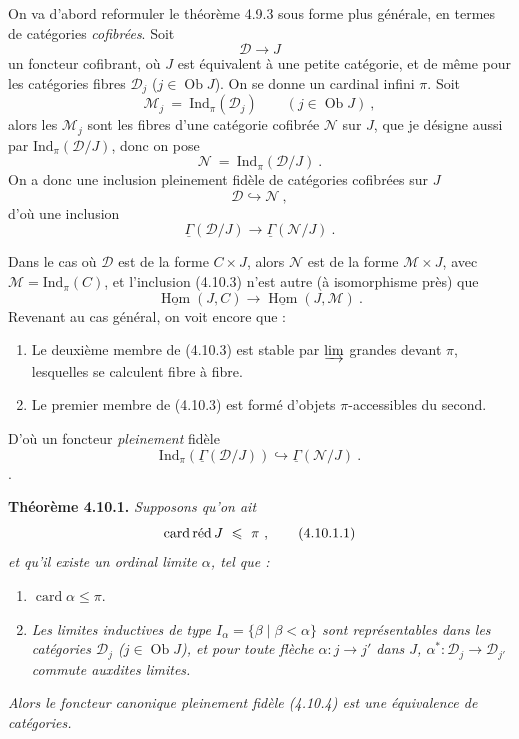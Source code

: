 \documentclass[11pt]{article}
\newcommand{\printedpage}[1]{\marginpar{\footnotesize p.~#1}}
\newcommand{\msp}[1]{\marginpar{\footnotesize [#1]}}
\newcommand{\Ind}{\mathrm{Ind}}
\newcommand{\Ob}{\operatorname{Ob}}
\newcommand{\card}{\operatorname{card}}
\newcommand{\uGamma}{\underline{\Gamma}}
\begin{document}
On va d'abord reformuler le théorème 4.9.3 sous forme plus générale, en termes de catégories \textit{cofibrées}. Soit
\[
\mathcal{D} \longrightarrow J \tag*{(4.10.1)}
\]
un foncteur cofibrant, où $J$ est équivalent à une petite catégorie, et de même pour les catégories fibres $\mathcal{D}_j$ ($j \in \Ob J$). On se donne un cardinal infini $\pi$. Soit
\[
\mathcal{M}_j \ = \ \Ind_\pi(\mathcal{D}_j) \qquad (j \in \Ob J) \ , \tag*{(4.10.2)}
\]
alors les $\mathcal{M}_j$ sont les fibres d'une catégorie cofibrée $\mathcal{N}$ sur $J$, que je désigne aussi par $\Ind_\pi(\mathcal{D}/J)$, donc on pose
\[
\mathcal{N} \ = \ \Ind_\pi(\mathcal{D}/J) \ . \tag*{(4.10.3)}
\]
On a donc une inclusion pleinement fidèle de catégories cofibrées sur $J$
\[
\mathcal{D} \hookrightarrow \mathcal{N} \ ,
\]
d'où une inclusion
\[
\uGamma(\mathcal{D}/J) \longrightarrow \uGamma(\mathcal{N}/J) \ . \tag*{(4.10.4)}
\]

\msp{page 244}
Dans le cas où $\mathcal{D}$ est de la forme $C \times J$, alors $\mathcal{N}$ est de la forme $\mathcal{M} \times J$, avec $\mathcal{M} = \Ind_\pi(C)$, et l'inclusion (4.10.3) n'est autre (à isomorphisme près) que
\[
\underline{\operatorname{Hom}}(J, C) \longrightarrow \underline{\operatorname{Hom}}(J, \mathcal{M}) \ .
\]
Revenant au cas général, on voit encore que :
\begin{enumerate}[label={}, leftmargin=3em]
\item[1°)] Le deuxième membre de (4.10.3) est stable par $\varinjlim$ grandes devant $\pi$, lesquelles se calculent fibre à fibre.
\item[2°)] Le premier membre de (4.10.3) est formé d'objets $\pi$-accessibles du second.
\end{enumerate}
D'où un foncteur \textit{pleinement} fidèle
\[
\Ind_\pi(\uGamma(\mathcal{D}/J)) \hookrightarrow \uGamma(\mathcal{N}/J) \ . \tag*{(4.10.4)}
\]
\setcounter{footnote}{103}%
.

\printedpage{92}

\textbf{Théorème 4.10.1.} \textit{Supposons qu'on ait}
\[
\mathrm{card}\,\textup{réd}\, J \ \leqslant \ \pi \ , \tag*{(4.10.1.1)}
\]
\textit{et qu'il existe un ordinal limite $\alpha$, tel que :}
\begin{enumerate}[label={}, leftmargin=3em]
\item[\textit{1)}] $\card \alpha \leqslant \pi$.
\item[\textit{2)}] \textit{Les limites inductives de}
\msp{page 245}
\textit{type $I_\alpha = \{\beta \mid \beta < \alpha\}$ sont représentables dans les catégories $\mathcal{D}_j$ ($j \in \Ob J$), et pour toute flèche $\alpha : j \longrightarrow j'$ dans $J$, $\alpha^* : \mathcal{D}_j \longrightarrow \mathcal{D}_{j'}$ commute auxdites limites.}
\end{enumerate}
\textit{Alors le foncteur canonique pleinement fidèle (4.10.4) est une équivalence de catégories.}
\end{document}
